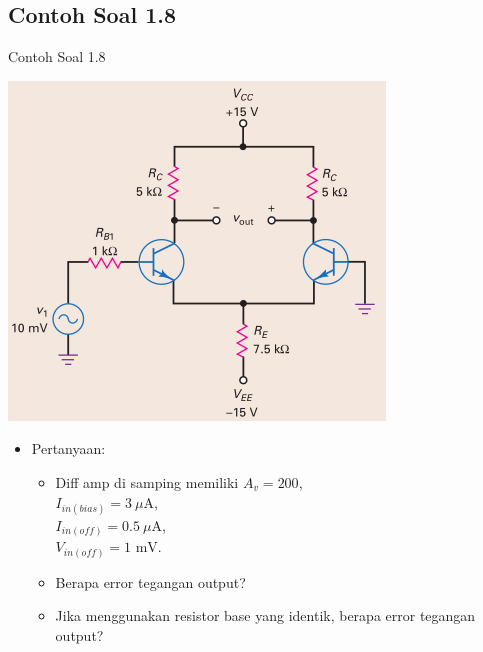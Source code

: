 \documentclass[aspectratio=169]{beamer}
\begin{document}
\subsection{Contoh Soal 1.8}
\begin{frame}{Contoh Soal 1.8}
	\begin{multicols}{2}
		\begin{center}
			\includegraphics[height=0.7\textheight]{gambar/01.latihan_soal_8}
		\end{center}
		\columnbreak
		\begin{itemize}
			\item Pertanyaan:
			\begin{itemize}
				\item Diff amp di samping memiliki $ A_v = 200 $,\\ $ I_{in(bias)} = 3~\mu\text{A} $, \\ $ I_{in(off)} = 0.5~\mu\text{A} $, \\ $ V_{in(off)} = 1 \text{ mV}$.  
				\item Berapa error tegangan output?
				\item Jika menggunakan resistor base yang identik, berapa error tegangan output?
			\end{itemize}
		\end{itemize}
	\end{multicols}
\end{frame}
\end{document}
